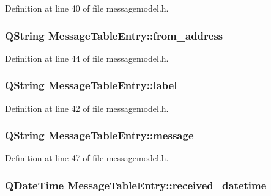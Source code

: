 Definition at line 40 of file messagemodel.\+h.

\hypertarget{struct_message_table_entry_a0a79ec4e1251c9c2948f02e5dd615089}{}
\subsubsection[{from\+\_\+address}]{\setlength{\rightskip}{0pt plus 5cm}Q\+String Message\+Table\+Entry\+::from\+\_\+address}\label{struct_message_table_entry_a0a79ec4e1251c9c2948f02e5dd615089}


Definition at line 44 of file messagemodel.\+h.

\hypertarget{struct_message_table_entry_a5415b80eea55bcfa9691b77721ded722}{}
\subsubsection[{label}]{\setlength{\rightskip}{0pt plus 5cm}Q\+String Message\+Table\+Entry\+::label}\label{struct_message_table_entry_a5415b80eea55bcfa9691b77721ded722}


Definition at line 42 of file messagemodel.\+h.

\hypertarget{struct_message_table_entry_a2b795631375fbc3f2e70b78834b2cf49}{}
\subsubsection[{message}]{\setlength{\rightskip}{0pt plus 5cm}Q\+String Message\+Table\+Entry\+::message}\label{struct_message_table_entry_a2b795631375fbc3f2e70b78834b2cf49}


Definition at line 47 of file messagemodel.\+h.

\hypertarget{struct_message_table_entry_a6143e8829e5cc13b77456893161e03aa}{}
\subsubsection[{received\+\_\+datetime}]{\setlength{\rightskip}{0pt plus 5cm}Q\+Date\+Time Message\+Table\+Entry\+::received\+\_\+datetime}\label{struct_message_table_entry_a6143e8829e5cc13b77456893161e03aa}



